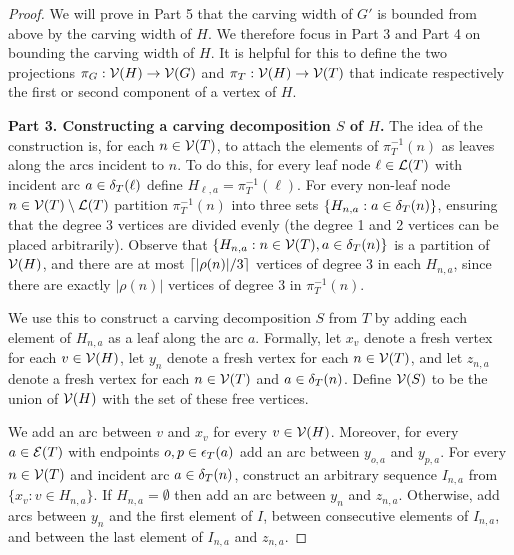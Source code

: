 \begin{proof}
We will prove in Part 5 that the carving width of $G'$ is bounded from above by the carving width of $H$. We therefore focus in Part 3 and Part 4 on bounding the carving width of $H$. It is helpful for this to define the two projections $\pi_G : \mathcal{V}(H) \rightarrow \mathcal{V}(G)$ and $\pi_T : \mathcal{V}(H) \rightarrow \mathcal{V}(T)$ that indicate respectively the first or second component of a vertex of $H$. 



\textbf{Part 3. Constructing a carving decomposition $S$ of $H$.}
The idea of the construction is, for each $n \in \mathcal{V}(T)$, to attach the elements of $\pi_T^{-1}(n)$ as leaves along the arcs incident to $n$. To do this, for every leaf node $\ell \in \mathcal{L}(T)$ with incident arc $a \in \delta_{T}(\ell)$ define $H_{\ell, a} = \pi_T^{-1}(\ell)$. For every non-leaf node $n \in \mathcal{V}(T) \setminus \mathcal{L}(T)$ partition $\pi_T^{-1}(n)$ into three sets $\{H_{n,a} : a \in \delta_{T}(n)\}$, ensuring that the degree 3 vertices are divided evenly (the degree 1 and 2 vertices can be placed arbitrarily). Observe that $\{H_{n,a} : n \in \mathcal{V}(T), a \in \delta_{T}(n)\}$ is a partition of $\mathcal{V}(H)$, and there are at most $\lceil|\rho(n)|/3\rceil$ vertices of degree 3 in each $H_{n,a}$, since there are exactly $|\rho(n)|$ vertices of degree 3 in $\pi_T^{-1}(n)$. 

We use this to construct a carving decomposition $S$ from $T$ by adding each element of $H_{n,a}$ as a leaf along the arc $a$. Formally, let $x_v$ denote a fresh vertex for each $v \in \mathcal{V}(H)$, let $y_n$ denote a fresh vertex for each $n \in \mathcal{V}(T)$, and let $z_{n,a}$ denote a fresh vertex for each $n \in \mathcal{V}(T)$ and $a \in \delta_{T}(n)$. Define $\mathcal{V}(S)$ to be the union of $\mathcal{V}(H)$ with the set of these free vertices. 

We add an arc between $v$ and $x_v$ for every $v \in \mathcal{V}(H)$. Moreover, for every $a \in \mathcal{E}(T)$ with endpoints $o, p \in \epsilon_{T}(a)$ add an arc between $y_{o,a}$ and $y_{p,a}$. For every $n \in \mathcal{V}(T)$ and incident arc $a \in \delta_{T}(n)$, construct an arbitrary sequence $I_{n,a}$ from $\{x_v : v \in H_{n,a}\}$. If $H_{n,a} = \emptyset$ then add an arc between $y_n$ and $z_{n,a}$. Otherwise, add arcs between $y_n$ and the first element of $I$, between consecutive elements of $I_{n,a}$, and between the last element of $I_{n,a}$ and $z_{n,a}$. 


\end{proof}
